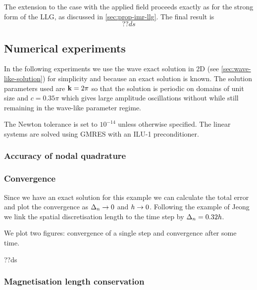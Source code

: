 The extension to the case with the applied field proceeds exactly as for the strong form of the LLG, as discussed in \autoref{sec:prop-imr-llg}.
The final result is
\begin{equation}
  ??ds
\end{equation}


\subsection{Numerical experiments}
\label{sec:numer-exper}

In the following experiments we use the wave exact solution in 2D (see \autoref{sec:wave-like-solution}) for simplicity and because an exact solution is known.
The solution parameters used are $\mathbf{k} = 2\pi$ so that the solution is periodic on domains of unit size and $c = 0.35\pi$ which gives large amplitude oscillations without while still remaining in the wave-like parameter regime.

The Newton tolerance is set to $10^{-14}$ unless otherwise specified.
The linear systems are solved using GMRES with an ILU-1 preconditioner.


\subsubsection{Accuracy of nodal quadrature}



\subsubsection{Convergence}

Since we have an exact solution for this example we can calculate the total error and plot the convergence as $\Delta_{n} \rightarrow 0$ and $h \rightarrow 0$.
Following the example of Jeong \etal\cite{Jeong2014} we link the spatial discretisation length to the time step by $\Delta_{n} = 0.32h$.

We plot two figures: convergence of a single step and convergence after some time.

??ds


\subsubsection{Magnetisation length conservation}


